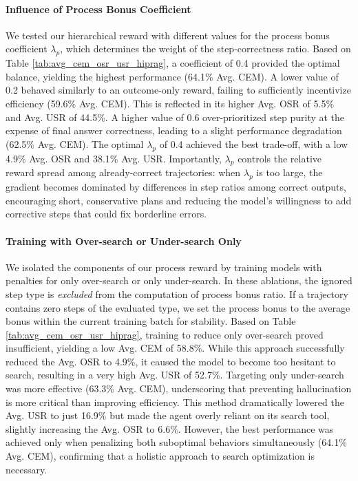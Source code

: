 \documentclass{article}
\begin{document}
\paragraph{Influence of Process Bonus Coefficient}
We tested our hierarchical reward with different values for the process bonus coefficient
$\lambda_p$, which determines the weight of the step-correctness ratio. Based on Table \ref{tab:avg_cem_osr_usr_hiprag}, a coefficient of 0.4 provided the optimal balance, yielding the highest performance (64.1\% Avg. CEM). A lower value of 0.2 behaved similarly to an outcome-only reward, failing to sufficiently incentivize efficiency (59.6\% Avg. CEM). This is reflected in its higher Avg. OSR of 5.5\% and Avg. USR of 44.5\%. A higher value of 0.6 over-prioritized step purity at the expense of final answer correctness, leading to a slight performance degradation (62.5\% Avg. CEM). The optimal $\lambda_p$ of 0.4 achieved the best trade-off, with a low 4.9\% Avg. OSR and 38.1\% Avg. USR. Importantly, $\lambda_p$ controls the relative reward spread among already-correct trajectories: when $\lambda_p$ is too large, the gradient becomes dominated by differences in step ratios among correct outputs, encouraging short, conservative plans and reducing the model's willingness to add corrective steps that could fix borderline errors.

\paragraph{Training with Over-search or Under-search Only}
We isolated the components of our process reward by training models with penalties for only over-search or only under-search. In these ablations, the ignored step type is \emph{excluded} from the computation of process bonus ratio. If a trajectory contains zero steps of the evaluated type, we set the process bonus to the average bonus within the current training batch for stability. Based on Table \ref{tab:avg_cem_osr_usr_hiprag}, training to reduce only over-search proved insufficient, yielding a low Avg. CEM of 58.8\%. While this approach successfully reduced the Avg. OSR to 4.9\%, it caused the model to become too hesitant to search, resulting in a very high Avg. USR of 52.7\%. Targeting only under-search was more effective (63.3\% Avg. CEM), underscoring that preventing hallucination is more critical than improving efficiency. This method dramatically lowered the Avg. USR to just 16.9\% but made the agent overly reliant on its search tool, slightly increasing the Avg. OSR to 6.6\%. However, the best performance was achieved only when penalizing both suboptimal behaviors simultaneously (64.1\% Avg. CEM), confirming that a holistic approach to search optimization is necessary.
\end{document}
